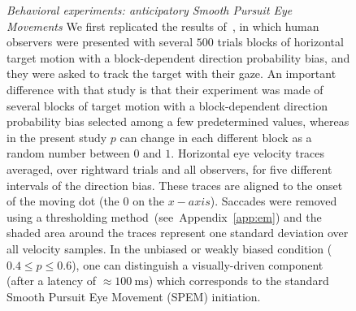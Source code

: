 \documentclass[12pt,english]{article}%
\newcommand{\ms}{\si{\milli\second}}%
\newcommand{\citet}[1]{\textcite{#1}}
\newcommand{\seeFig}[1]{Figure~\ref{fig:#1}}
\newcommand{\seeApp}[1]{Appendix~\ref{app:#1}}
\begin{document}
\begin{figure}%
\caption{
\emph{Behavioral experiments: anticipatory Smooth Pursuit Eye Movements}
We first replicated the results of~\citet{Montagnini2010},
in which human observers were presented with several $500$ trials blocks of horizontal target motion with a block-dependent direction probability bias, and they were asked to track the target with their gaze.
An important difference with that study is that their experiment was made of several blocks of target motion with a block-dependent direction probability bias selected among a few predetermined values, whereas in the present study $p$ can change in each different block as a random number between $0$ and $1$.
Horizontal eye velocity traces
averaged, over rightward trials and all observers, for five different intervals of the direction bias.
These traces are aligned to the onset of the moving dot (the $0$ on the $x-axis$).
Saccades were removed using a thresholding method~(see~\seeApp{em}) and
the shaded area around the traces represent one standard deviation over all velocity samples.
In the unbiased or weakly biased condition ($0.4\leq p\leq 0.6 $), one can distinguish
a visually-driven component (after a latency of $\approx 100~\ms$)
which corresponds to the standard Smooth Pursuit Eye Movement (SPEM) initiation.
}
\end{figure}
\end{document}

